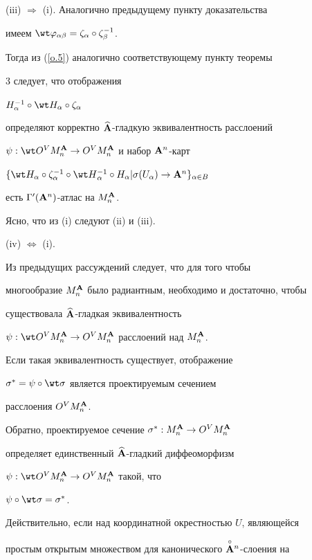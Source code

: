 (iii) $\Rightarrow$ (i). Аналогично предыдущему пункту доказательства


имеем $\wt\varphi_{\alpha\beta}=\zeta_\alpha\circ\zeta_{\beta}^{-1}$.


Тогда из (\ref{o.5}) аналогично соответствующему пункту теоремы


3 следует, что отображения


$H_{\alpha}^{-1}\circ\wt H_{\alpha}\circ\zeta_{\alpha}$


определяют корректно $\widehat{{\bold A}}$-гладкую эквивалентность расслоений


$\psi:\wt O^VM^\A_n\to O^VM^\A_n$ и набор ${\bold A}^n$-карт


$\{\wt H_{\alpha}\circ


\zeta_{\alpha}^{-1}\circ\wt H{}_{\alpha}^{-1}\circ


H_{\alpha}|\sigma(U_\alpha)\to\A^n\}_{\alpha \in B}$


есть $\Gamma'({\bold A}^n)$-атлас на $M^{\bold A}_n$.





Ясно, что из (i) следуют  (ii) и (iii).





(iv) $\Leftrightarrow$ (i).


Из предыдущих рассуждений следует, что для того чтобы


многообразие $M^{\bold A}_n$ было радиантным, необходимо и достаточно, чтобы


существовала $\widehat{{\bold A}}$-гладкая эквивалентность


$\psi:\wt O^VM^\A_n\to O^VM^\A_n$ расслоений над $M^{\bold A}_n$.


Если такая эквивалентность существует, отображение


$\sigma^*=\psi\circ\wt\sigma$ является проектируемым сечением


расслоения $O^VM^{\bold A}_n$.


Обратно, проектируемое сечение $\sigma^*:M^{\bold A}_n\to O^VM^{\bold A}_n$


определяет единственный $\widehat{{\bold A}}$-гладкий диффеоморфизм


$\psi:\wt O^VM^\A_n\to O^VM^\A_n$ такой, что


$\psi\circ\wt\sigma=\sigma^*$.


Действительно, если над координатной окрестностью $U$, являющейся


простым открытым множеством для канонического $\overset{\circ}{\bold A}{}^n$-слоения на


